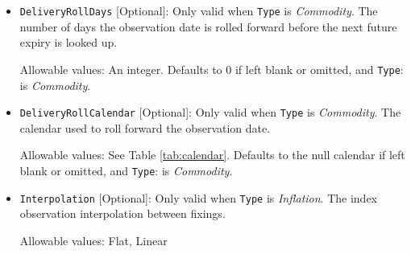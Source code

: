 \begin{itemize}
\item \lstinline!DeliveryRollDays! [Optional]:
Only valid when  \lstinline!Type! is  \emph{Commodity}.  The number of days the observation date is rolled forward before the
  next future expiry is looked up.
  
Allowable values: An integer. Defaults to 0 if left blank or omitted, and \lstinline!Type!: is  \emph{Commodity}.

\item \lstinline!DeliveryRollCalendar! [Optional]:
Only valid when  \lstinline!Type! is  \emph{Commodity}.  The calendar used to roll forward the observation date.

Allowable values: See Table \ref{tab:calendar}. Defaults to the null calendar if left blank or omitted, and \lstinline!Type!: is  \emph{Commodity}.

\item \lstinline!Interpolation! [Optional]:
Only valid when \lstinline!Type! is  \emph{Inflation}. The index observation interpolation between fixings.

Allowable values: Flat, Linear

\end{itemize}
